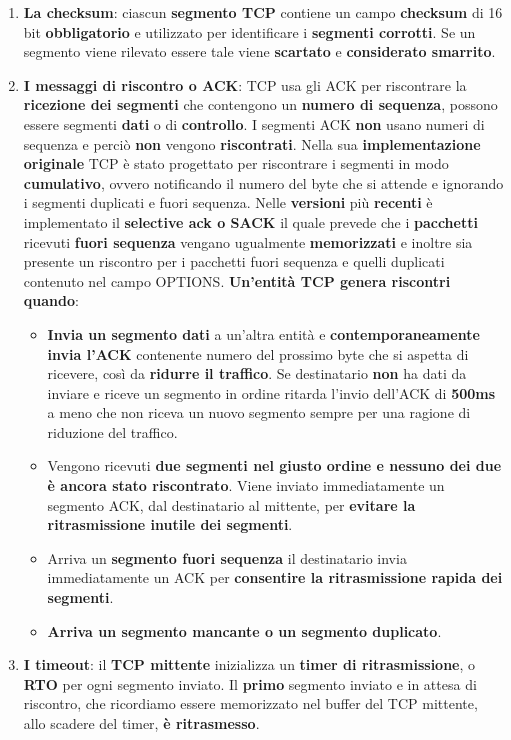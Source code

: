 \documentclass[11pt,a4paper]{article}
\theoremstyle{definition}
\begin{document}
\begin{enumerate}
	\item \textbf{La checksum}: ciascun \textbf{segmento TCP} contiene un campo \textbf{checksum} di 16 bit
	      \textbf{obbligatorio} e utilizzato per identificare i \textbf{segmenti corrotti}. Se un segmento viene rilevato essere tale viene \textbf{scartato} e \textbf{considerato smarrito}.
	\item \textbf{I messaggi di riscontro o ACK}: TCP usa gli ACK per riscontrare la \textbf{ricezione dei segmenti} che contengono un \textbf{numero di sequenza}, possono essere segmenti \textbf{dati} o di \textbf{controllo}. I segmenti ACK \textbf{non} usano numeri di sequenza e perciò \textbf{non} vengono \textbf{riscontrati}. Nella sua \textbf{implementazione originale} TCP è stato progettato per riscontrare i segmenti in modo \textbf{cumulativo}, ovvero notificando il numero del byte che si attende e ignorando i segmenti duplicati e fuori sequenza. Nelle \textbf{versioni} più \textbf{recenti} è implementato il \textbf{selective ack o SACK} il quale prevede che i \textbf{pacchetti} ricevuti \textbf{fuori sequenza} vengano ugualmente \textbf{memorizzati} e inoltre sia presente un riscontro per i pacchetti fuori sequenza e quelli duplicati contenuto nel campo OPTIONS. \textbf{Un'entità TCP genera riscontri quando}:
	      \begin{itemize}
		      \item \textbf{Invia un segmento dati} a un'altra entità e \textbf{contemporaneamente invia l'ACK} contenente numero del prossimo byte che si aspetta di ricevere, così da \textbf{ridurre il traffico}. Se destinatario \textbf{non} ha dati da inviare e riceve un segmento in ordine ritarda l'invio dell'ACK di \textbf{500ms} a meno che non riceva un nuovo segmento sempre per una ragione di riduzione del traffico.
		      \item Vengono ricevuti \textbf{due segmenti nel giusto ordine e nessuno dei due è ancora stato riscontrato}. Viene inviato immediatamente un segmento ACK, dal destinatario al mittente, per \textbf{evitare la ritrasmissione inutile dei segmenti}.
		      \item Arriva un \textbf{segmento fuori sequenza} il destinatario invia immediatamente un ACK per \textbf{consentire la ritrasmissione rapida dei segmenti}.
		      \item \textbf{Arriva un segmento mancante o un segmento duplicato}.
	      \end{itemize}
	\item \textbf{I timeout}: il \textbf{TCP mittente} inizializza un \textbf{timer di ritrasmissione}, o \textbf{RTO} per ogni segmento inviato. Il \textbf{primo} segmento inviato e in attesa di riscontro, che ricordiamo essere memorizzato nel buffer del TCP mittente, allo scadere del timer, \textbf{è ritrasmesso}.
\end{enumerate}
\end{document}
